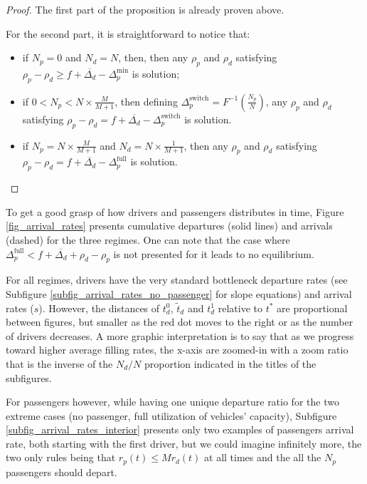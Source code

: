\documentclass[english, a4paper]{article}
\theoremstyle{plain}
\theoremstyle{definition}
\theoremstyle{remark}
\begin{document}
\begin{proof}
    The first part of the proposition is already proven above.

    For the second part, it is straightforward to notice that:
    \begin{itemize}
        \item if $N_p = 0$ and $N_d = N$, then, then any $\rho _p$ and $\rho _d$ satisfying $\rho _p - \rho _d \geq f + \overline{\Delta _d} - \Delta _p^{\text{min}}$ is solution;
        \item if $0 < N_p < N \times \frac{M}{M+1}$, then defining $\Delta _p^{\text{switch}} = F^{-1}\left(\frac{N _p}{N} \right)$, any $\rho _p$ and $\rho _d$ satisfying $\rho _p - \rho _d = f + \overline{\Delta _d} - \Delta _p^{\text{switch}}$ is solution.
        \item if $N_p = N \times \frac{M}{M+ 1}$ and $N_d = N \times \frac{1}{M+ 1}$, then any $\rho _p$ and $\rho _d$ satisfying $\rho _p - \rho _d = f + \overline{\Delta _d} - \Delta _p^{\text{full}}$ is solution.
    \end{itemize}
    
\end{proof}

To get a good grasp of how drivers and passengers distributes in time, Figure \ref{fig_arrival_rates} presents cumulative departures (solid lines) and arrivals (dashed) for the three regimes. One can note that the case where $\Delta_p^{\text{full}} < f + \overline{\Delta_d} + \rho_d - \rho_p$ is not presented for it leads to no equilibrium.

For all regimes, drivers have the very standard bottleneck departure rates (see Subfigure \ref{subfig_arrival_rates_no_passenger} for slope equations) and arrival rates ($s$). However, the distances of $t_d^0$, $\tilde{t}_d$ and $t_d^1$ relative to $t^*$ are proportional between figures, but smaller as the red dot moves to the right or as the number of drivers decreases. A more graphic interpretation is to say that as we progress toward higher average filling rates, the x-axis are zoomed-in with a zoom ratio that is the inverse of the $N_d / N$ proportion indicated in the titles of the subfigures.

For passengers however, while having one unique departure ratio for the two extreme cases (no passenger, full utilization of vehicles’ capacity), Subfigure \ref{subfig_arrival_rates_interior} presents only two examples of passengers arrival rate, both starting with the first driver, but we could imagine infinitely more, the two only rules being that $r_p(t) \leq Mr_d(t)$ at all times and the all the $N_p$ passengers should depart.
\end{document}
